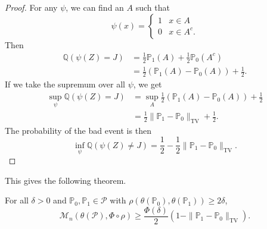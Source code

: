 \begin{proof}
    For any $\psi$, we can find an $A$ such that
    \begin{equation*}
        \psi(x) = \begin{cases} 1 & x \in A \\ 0 & x \in A^c. \end{cases}
    \end{equation*}
    Then
    \begin{align*}
        \mathbb{Q}(\psi(Z) = J) &= \frac{1}{2}\mathbb{P}_1(A) + \frac{1}{2}\mathbb{P}_0(A^c) \\
        &= \frac{1}{2}(\mathbb{P}_1(A) - \mathbb{P}_0(A)) + \frac{1}{2}.
    \end{align*}
    If we take the supremum over all $\psi$, we get
    \begin{align*}
        \sup_\psi \mathbb{Q}(\psi(Z) = J) &= \sup_A \frac{1}{2}(\mathbb{P}_1(A) - \mathbb{P}_0(A)) + \frac{1}{2} \\
        &= \frac{1}{2}\|\mathbb{P}_1 - \mathbb{P}_0\|_{\mathrm{TV}} + \frac{1}{2}.
    \end{align*}
    The probability of the bad event is then
    \begin{equation*}
        \inf_\psi \mathbb{Q}(\psi(Z) \neq J) = \frac{1}{2} - \frac{1}{2}\|\mathbb{P}_1 - \mathbb{P}_0\|_{\mathrm{TV}}.
    \end{equation*}
\end{proof}

This gives the following theorem.

\begin{thm}
    For all $\delta > 0$ and $\mathbb{P}_0, \mathbb{P}_1 \in \mathcal{P}$ with $\rho(\theta(\mathbb{P}_0), \theta(\mathbb{P}_1)) \geq 2\delta$,
    \begin{equation*}
        \mathcal{M}_n(\theta(\mathcal{P}), \Phi \circ \rho) \geq \frac{\Phi(\delta)}{2}\left(1 - \|\mathbb{P}_1 - \mathbb{P}_0\|_{\mathrm{TV}}\right).
    \end{equation*}
\end{thm}

